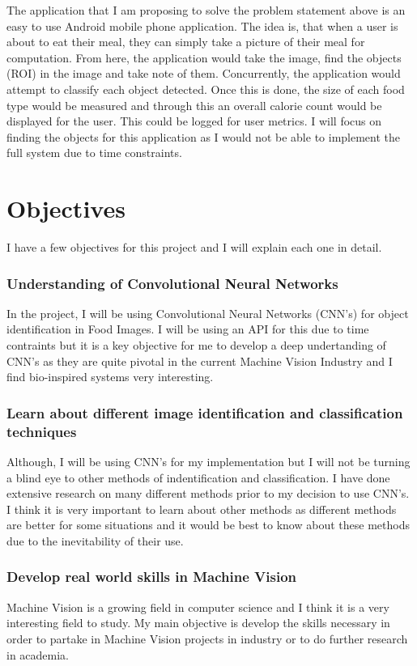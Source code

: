 The application that I am proposing to solve the problem statement above is an easy to use Android mobile phone application.
The idea is, that when a user is about to eat their meal, they can simply take a picture of their meal for computation.
From here, the application would take the image, find the objects (ROI) in the image and take note of them.
Concurrently, the application would attempt to classify each object detected.
Once this is done, the size of each food type would be measured and through this an overall calorie count would be displayed for the user.
This could be logged for user metrics. 
I will focus on finding the objects for this application as I would not be able to implement the full system due to time constraints.

\section{Objectives}
I have a few objectives for this project and I will explain each one in detail.
\subsubsection{Understanding of Convolutional Neural Networks}
In the project, I will be using Convolutional Neural Networks (CNN's) for object identification in Food Images.
I will be using an API for this due to time contraints but it is a key objective for me to develop a deep undertanding of CNN's as they are quite pivotal in the current Machine Vision Industry and I find bio-inspired systems very interesting.

\subsubsection{Learn about different image identification and classification techniques}
Although, I will be using CNN's for my implementation but I will not be turning a blind eye to other methods of indentification and classification.
I have done extensive research on many different methods prior to my decision to use CNN's.
I think it is very important to learn about other methods as different methods are better for some situations and it would be best to know about these methods due to the inevitability of their use.

\subsubsection{Develop real world skills in Machine Vision}
Machine Vision is a growing field in computer science and I think it is a very interesting field to study.
My main objective is develop the skills necessary in order to partake in Machine Vision projects in industry or to do further research in academia.

